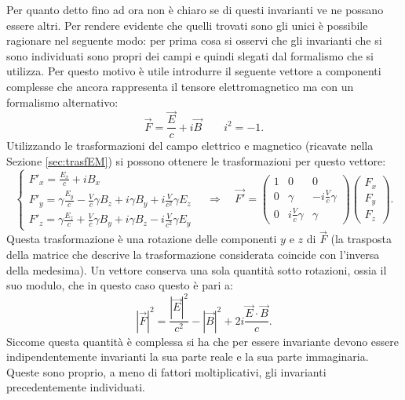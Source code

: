 Per quanto detto fino ad ora non è chiaro se di questi invarianti ve ne possano essere altri. Per rendere evidente che quelli trovati sono gli unici è possibile ragionare nel seguente modo: per prima cosa si osservi che gli invarianti che si sono individuati sono propri dei campi e quindi slegati dal formalismo che si utilizza. Per questo motivo è utile introdurre il seguente vettore a componenti complesse che ancora rappresenta il tensore elettromagnetico ma con un formalismo alternativo:
\begin{equation*}
    \vec{F}=\frac{\vec E}{c} +i\vec B \qquad i^2=-1.
\end{equation*}
Utilizzando le trasformazioni del campo elettrico e magnetico (ricavate nella Sezione \ref{sec:trasfEM}) si possono ottenere le trasformazioni per questo vettore:
\begin{equation*}
    \begin{cases}
        F'_x=\frac{E_x}{c}+iB_x\\
        F'_y=\gamma\frac{E_y}{c}-\frac{V}{c}\gamma B_z+i\gamma B_y+i\frac{V}{c^2}\gamma E_z\\
        F'_z=\gamma\frac{E_z}{c}+\frac{V}{c}\gamma B_y+i\gamma B_z-i\frac{V}{c^2}\gamma E_y
    \end{cases}
    \quad\Rightarrow\quad
    \vec{F'}=\begin{pmatrix}
        1&0&0\\
        0&\gamma&-i\frac{V}{c}\gamma\\
        0&i\frac{V}{c}\gamma&\gamma
    \end{pmatrix}
    \begin{pmatrix}
        F_x\\F_y\\F_z
    \end{pmatrix}.
\end{equation*}
Questa trasformazione è una rotazione delle componenti $y$ e $z$ di $\vec{F}$ (la trasposta della matrice che descrive la trasformazione considerata coincide con l'inversa della medesima). Un vettore conserva una sola quantità sotto rotazioni, ossia il suo modulo, che in questo caso questo è pari a:
\begin{equation*}
    |\vec F|^2=\frac{|\vec E|^2}{c^2}-|\vec B|^2+2i\frac{\vec E\cdot\vec B}{c}.
\end{equation*}
Siccome questa quantità è complessa si ha che per essere invariante devono essere indipendentemente invarianti la sua parte reale e la sua parte immaginaria. Queste sono proprio, a meno di fattori moltiplicativi, gli invarianti precedentemente individuati.